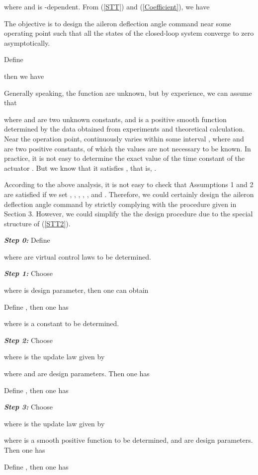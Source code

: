 \documentclass{tSYS2e}
\theoremstyle{plain}
\theoremstyle{definition}
\begin{document}
where  and is -dependent.
From (\ref{STT}) and (\ref{Coefficient}), we have


The objective is to design the aileron deflection angle command  near some operating point such that all the states of the closed-loop system
converge to zero asymptotically.

Define

then we have


Generally speaking, the function  are
unknown, but by experience, we can assume that

where  and  are two unknown constants,
and  is a positive smooth function determined by the data obtained from experiments and theoretical
calculation. Near the operation point,  continuously varies within some interval ,
where  and  are two positive constants, of which the values are not necessary to be known.
In practice, it is not easy to determine the exact value of the time constant of the actuator .
But we know that it satisfies , that is, .

According to the above analysis, it is not easy to check that Assumptions 1 and 2 are satisfied
if we set , , , , , and .
Therefore, we could certainly design the aileron deflection angle command by strictly complying with the procedure given in Section 3.
However, we could simplify the the design procedure due to the special structure of (\ref{STT2}).

\textbf{\emph{Step 0:}} Define

where  are virtual control laws to be determined.

\textbf{\emph{Step 1:}} Choose

where  is design parameter, then one can obtain

Define , then one has

where  is a constant to be determined.

\textbf{\emph{Step 2:}} Choose

where  is the update law given by

where  and  are design parameters. Then one has

Define , then one has



\textbf{\emph{Step 3:}} Choose

where  is the update law given by

where  is a smooth positive function to be determined,  and  are design parameters. Then one has

Define , then one has
\end{document}
